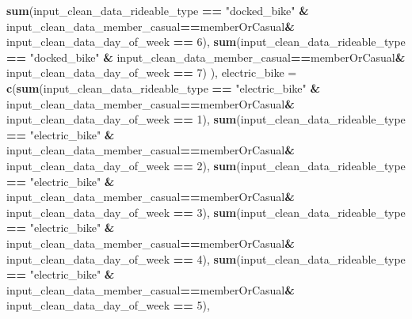\documentclass[
]{article}
\newenvironment{Shaded}{\begin{snugshade}}{\end{snugshade}}
\newcommand{\AttributeTok}[1]{\textcolor[rgb]{0.13,0.29,0.53}{#1}}
\newcommand{\DecValTok}[1]{\textcolor[rgb]{0.00,0.00,0.81}{#1}}
\newcommand{\FunctionTok}[1]{\textcolor[rgb]{0.13,0.29,0.53}{\textbf{#1}}}
\newcommand{\NormalTok}[1]{#1}
\newcommand{\SpecialCharTok}[1]{\textcolor[rgb]{0.81,0.36,0.00}{\textbf{#1}}}
\newcommand{\StringTok}[1]{\textcolor[rgb]{0.31,0.60,0.02}{#1}}
\begin{document}
\begin{Shaded}
\begin{Highlighting}[]
                                       \FunctionTok{sum}\NormalTok{(input\_clean\_data\_rideable\_type }\SpecialCharTok{==} \StringTok{"docked\_bike"} \SpecialCharTok{\&}\NormalTok{ input\_clean\_data\_member\_casual}\SpecialCharTok{==}\NormalTok{memberOrCasual}\SpecialCharTok{\&}\NormalTok{ input\_clean\_data\_day\_of\_week }\SpecialCharTok{==} \DecValTok{6}\NormalTok{),}
                                       \FunctionTok{sum}\NormalTok{(input\_clean\_data\_rideable\_type }\SpecialCharTok{==} \StringTok{"docked\_bike"} \SpecialCharTok{\&}\NormalTok{ input\_clean\_data\_member\_casual}\SpecialCharTok{==}\NormalTok{memberOrCasual}\SpecialCharTok{\&}\NormalTok{ input\_clean\_data\_day\_of\_week }\SpecialCharTok{==} \DecValTok{7}\NormalTok{)}
\NormalTok{                                       ),}
                       \AttributeTok{electric\_bike =} \FunctionTok{c}\NormalTok{(}\FunctionTok{sum}\NormalTok{(input\_clean\_data\_rideable\_type }\SpecialCharTok{==} \StringTok{"electric\_bike"} \SpecialCharTok{\&}\NormalTok{ input\_clean\_data\_member\_casual}\SpecialCharTok{==}\NormalTok{memberOrCasual}\SpecialCharTok{\&}\NormalTok{ input\_clean\_data\_day\_of\_week }\SpecialCharTok{==} \DecValTok{1}\NormalTok{),}
                                         \FunctionTok{sum}\NormalTok{(input\_clean\_data\_rideable\_type }\SpecialCharTok{==} \StringTok{"electric\_bike"} \SpecialCharTok{\&}\NormalTok{ input\_clean\_data\_member\_casual}\SpecialCharTok{==}\NormalTok{memberOrCasual}\SpecialCharTok{\&}\NormalTok{ input\_clean\_data\_day\_of\_week }\SpecialCharTok{==} \DecValTok{2}\NormalTok{),}
                                         \FunctionTok{sum}\NormalTok{(input\_clean\_data\_rideable\_type }\SpecialCharTok{==} \StringTok{"electric\_bike"} \SpecialCharTok{\&}\NormalTok{ input\_clean\_data\_member\_casual}\SpecialCharTok{==}\NormalTok{memberOrCasual}\SpecialCharTok{\&}\NormalTok{ input\_clean\_data\_day\_of\_week }\SpecialCharTok{==} \DecValTok{3}\NormalTok{),}
                                         \FunctionTok{sum}\NormalTok{(input\_clean\_data\_rideable\_type }\SpecialCharTok{==} \StringTok{"electric\_bike"} \SpecialCharTok{\&}\NormalTok{ input\_clean\_data\_member\_casual}\SpecialCharTok{==}\NormalTok{memberOrCasual}\SpecialCharTok{\&}\NormalTok{ input\_clean\_data\_day\_of\_week }\SpecialCharTok{==} \DecValTok{4}\NormalTok{),}
                                         \FunctionTok{sum}\NormalTok{(input\_clean\_data\_rideable\_type }\SpecialCharTok{==} \StringTok{"electric\_bike"} \SpecialCharTok{\&}\NormalTok{ input\_clean\_data\_member\_casual}\SpecialCharTok{==}\NormalTok{memberOrCasual}\SpecialCharTok{\&}\NormalTok{ input\_clean\_data\_day\_of\_week }\SpecialCharTok{==} \DecValTok{5}\NormalTok{),}

\end{Highlighting}
\end{Shaded}
\end{document}
